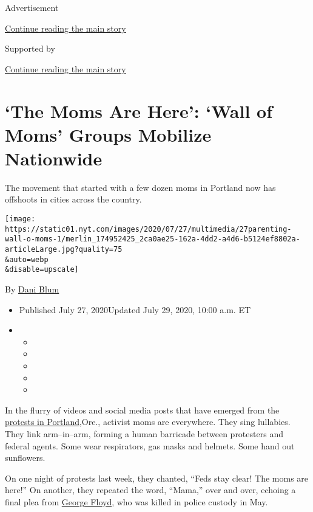 Advertisement

\protect\hyperlink{after-top}{Continue reading the main story}

Supported by

\protect\hyperlink{after-sponsor}{Continue reading the main story}

\hypertarget{the-moms-are-here-wall-of-moms-groups-mobilize-nationwide}{%
\section{`The Moms Are Here': `Wall of Moms' Groups Mobilize
Nationwide}\label{the-moms-are-here-wall-of-moms-groups-mobilize-nationwide}}

The movement that started with a few dozen moms in Portland now has
offshoots in cities across the country.

\texttt{[image: https://static01.nyt.com/images/2020/07/27/multimedia/27parenting-wall-o-moms-1/merlin\_174952425\_2ca0ae25-162a-4dd2-a4d6-b5124ef8802a-articleLarge.jpg?quality=75\\\&auto=webp\\\&disable=upscale]}

By \href{https://www.nytimes.com/by/dani-blum}{Dani Blum}

\begin{itemize}
\item
  Published July 27, 2020Updated July 29, 2020, 10:00 a.m. ET
\item
  \begin{itemize}
  \item
  \item
  \item
  \item
  \item
  \end{itemize}
\end{itemize}

In the flurry of videos and social media posts that have emerged from
the
\href{https://www.nytimes.com/video/us/100000007243995/portland-protests-federal-government.html}{protests
in Portland,}Ore., activist moms are everywhere. They sing lullabies.
They link arm--in--arm, forming a human barricade between protesters and
federal agents. Some wear respirators, gas masks and helmets. Some hand
out sunflowers.

On one night of protests last week, they chanted, ``Feds stay clear! The
moms are here!'' On another, they repeated the word, ``Mama,'' over and
over, echoing a final plea from
\href{https://www.nytimes.com/2020/05/31/us/george-floyd-investigation.html}{George
Floyd}, who was killed in police custody in May.

